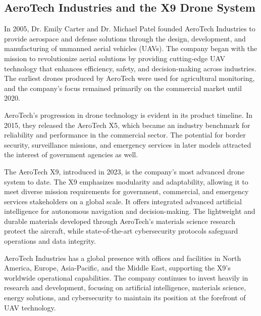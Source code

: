 \subsection{AeroTech Industries and the X9 Drone System}

\noindent In 2005, Dr. Emily Carter and Dr. Michael Patel founded AeroTech Industries to provide aerospace and defense solutions through the design, development, and manufacturing of unmanned aerial vehicles (UAVs). The company began with the mission to revolutionize aerial solutions by providing cutting-edge UAV technology that enhances efficiency, safety, and decision-making across industries. The earliest drones produced by AeroTech were used for agricultural monitoring, and the company's focus remained primarily on the commercial market until 2020.

\bigskip

\noindent AeroTech's progression in drone technology is evident in its product timeline. In 2015, they released the AeroTech X5, which became an industry benchmark for reliability and performance in the commercial sector. The potential for border security, surveillance missions, and emergency services in later models attracted the interest of government agencies as well.

\bigskip

\noindent The AeroTech X9, introduced in 2023, is the company's most advanced drone system to date. The X9 emphasizes modularity and adaptability, allowing it to meet diverse mission requirements for government, commercial, and emergency services stakeholders on a global scale. It offers integrated advanced artificial intelligence for autonomous navigation and decision-making. The lightweight and durable materials developed through AeroTech's materials science research protect the aircraft, while state-of-the-art cybersecurity protocols safeguard operations and data integrity.

\bigskip

\noindent AeroTech Industries has a global presence with offices and facilities in North America, Europe, Asia-Pacific, and the Middle East, supporting the X9's worldwide operational capabilities. The company continues to invest heavily in research and development, focusing on artificial intelligence, materials science, energy solutions, and cybersecurity to maintain its position at the forefront of UAV technology.
